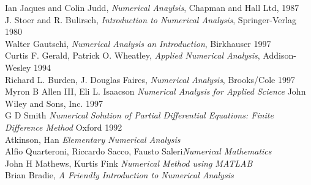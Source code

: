 \begin{thebibliography}{99}
 Ian Jaques and Colin Judd,
\textit{Numerical Anaylsis}, Chapman and Hall Ltd, 1987
\\
 J. Stoer and R. Bulirsch,
\textit{Introduction to Numerical Analysis}, Springer-Verlag 1980\\
 Walter Gautschi,
\textit{Numerical Analysis an Introduction}, Birkhauser 1997\\
 Curtis F. Gerald, Patrick O. Wheatley,
\textit{Applied Numerical Analysis}, Addison-Wesley 1994\\
 Richard L. Burden, J. Douglas Faires,
\textit{Numerical Analysis}, Brooks/Cole 1997\\
 Myron B Allen III, Eli L. Isaacson
\textit{Numerical Analysis for Applied Science} John Wiley and Sons, Inc. 1997\\
 G D Smith
\textit{Numerical Solution of Partial Differential Equations: Finite Difference Method}
Oxford 1992\\
 Atkinson, Han
\textit{Elementary Numerical Analysis }\\
 Alfio Quarteroni, Riccardo Sacco, Fausto Saleri\textit{Numerical Mathematics}\\
 John H Mathews,  Kurtis Fink
\textit{Numerical Method using MATLAB}\\
 Brian Bradie,  
\textit{A Friendly Introduction to Numerical Analysis}\\

\end{thebibliography}
